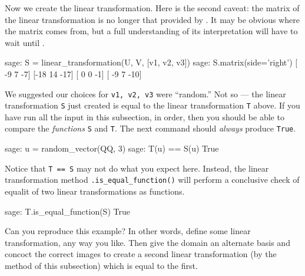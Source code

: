 %
Now we create the linear transformation.  Here is the second caveat:  the matrix of the linear transformation is no longer that provided by .  It may be obvious where the matrix comes from, but a full understanding of its interpretation will have to wait until .
%
\begin{sageexample}
sage: S = linear_transformation(U, V, [v1, v2, v3])
sage: S.matrix(side='right')
[ -9   7  -7]
[-18  14 -17]
[  0   0  -1]
[ -9   7 -10]
\end{sageexample}
%
We suggested our choices for \verb?v1, v2, v3? were ``random.''  Not so --- the linear transformation \verb?S? just created is equal to the linear transformation \verb?T? above.  If you have run all the input in this subsection, in order, then you should be able to compare the \emph{functions} \verb?S? and \verb?T?.  The next command should \emph{always} produce \verb?True?.
%
\begin{sageexample}
sage: u = random_vector(QQ, 3)
sage: T(u) == S(u)
True
\end{sageexample}
%
Notice that \verb?T == S? may not do what you expect here.  Instead, the linear transformation method \verb?.is_equal_function()? will perform a conclusive check of equalit of two linear transformations as functions.
%
\begin{sageexample}
sage: T.is_equal_function(S)
True
\end{sageexample}
%
Can you reproduce this example?  In other words, define some linear transformation, any way you like.  Then give the domain an alternate basis and concoct the correct images to create a second linear transformation (by the method of this subsection) which is equal to the first.
%
\begin{sageverbatim}
\end{sageverbatim}
%
